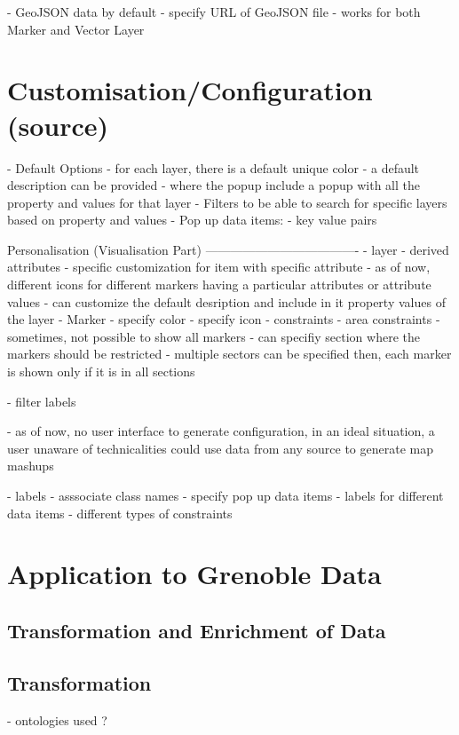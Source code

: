\documentclass[a4paper,pagenum,english]{rnti}
\begin{document}
{	- GeoJSON data by default
		- specify URL of GeoJSON file
		- works for both Marker and Vector Layer


\section{Customisation/Configuration (source)}\label{section:customisation}
- Default Options
	- for each layer, there is a default unique color
	- a default description can be provided
		- where the popup include a popup with all the property and values for that layer
	- Filters to be able to search for specific layers based on property and values
- Pop up data items:
	- key value pairs
	
	
Personalisation (Visualisation Part)
-------------------------------------
	- layer
		- derived attributes
		- specific customization for item with specific attribute
			- as of now, different icons for different markers having a particular attributes or attribute values
		- can customize the default desription and include in it property values of the layer
	- Marker
		- specify color
		- specify icon
	- constraints
		- area constraints
			- sometimes, not possible to show all markers
			- can specifiy section where the markers should be restricted
			- multiple sectors can be specified then, each marker is shown only if it is in all sections

	- filter labels

- as of now, no user interface to generate configuration, in an ideal situation, a user unaware of technicalities could use data from any source to generate map mashups


- labels 
- asssociate class names
- specify pop up data items
	- labels for different data items
- different types of constraints


\section{Application to Grenoble Data}\label{section:customisation}

\subsection{Transformation and Enrichment of Data}

\subsection{Transformation}
- ontologies used ?

}
\end{document}
